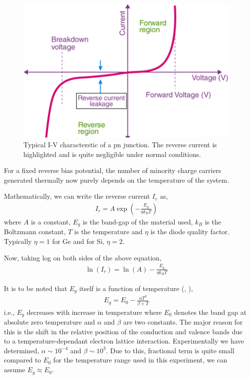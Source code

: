 \begin{figure}[h]
    \centering
    \includegraphics[width=1\columnwidth]{images/th2.png}
    \caption{Typical I-V characterstic of a pn junction. The reverse current is highlighted and is quite negligible under normal conditions.}
    \label{f2}
\end{figure}

For a fixed reverse bias potential, the number of minority charge carriers generated thermally now purely depends on the temperature of the system. 

Mathematically, we can write the reverse current $I_r$ as,
\begin{align}
    I_r = A \exp({-\frac{E_g}{\eta k_B T}})
\end{align}
\noindent where $A$ is a constant, $E_g$ is the band-gap of the material used, $k_B$ is the Boltzmann constant, $T$ is the temperature and $\eta$ is the diode quality factor. Typically $\eta=1$ for Ge and for Si, $\eta=2$.

Now, taking log on both sides of the above equation,
\begin{align}
    \ln{(I_r)} = \ln(A) - \frac{E_g}{\eta k_B T}
\end{align}

It is to be noted that $E_g$ itself is a function of temperature (\citeauthor{varshni-1967}, \citeyear{varshni-1967}),
\begin{align}\label{temp}
    E_g = E_0 - \frac{\alpha T^2}{\beta + T}
\end{align}
\noindent i.e., $E_g$ decreases with increase in temperature where $E_0$ denotes the band gap at absolute zero temperature and $\alpha$ and $\beta$ are two constants. The major reason for this is the shift in the relative position of the conduction and valence bands due to a temperature-dependant electron lattice interaction. Experimentally we have determined, $\alpha \sim 10^{-4}$ and $\beta \sim 10^3$. Due to this, fractional term is quite small compared to $E_0$ for the temperature range used in this experiment, we can assume $E_g \approx E_0$.

